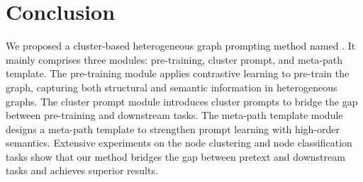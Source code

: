 \section{Conclusion}

We proposed a cluster-based heterogeneous graph prompting method named \ourmethod. It mainly comprises three modules: pre-training, cluster prompt, and meta-path template. The pre-training module applies contrastive learning to pre-train the graph, capturing both structural and semantic information in heterogeneous graphs. The cluster prompt module introduces cluster prompts to bridge the gap between pre-training and downstream tasks. The meta-path template module designs a meta-path template to strengthen prompt learning with high-order semantics. Extensive experiments on the node clustering and node classification tasks show that our method bridges the gap between pretext and downstream tasks and achieves superior results.